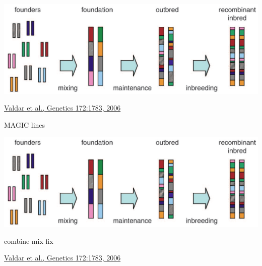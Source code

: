 \documentclass[12pt]{article}
\newcommand{\citesize}{\fontsize{14}{18} \selectfont}
\newcommand{\headsize}{\fontsize{35}{35} \selectfont}
\newcommand{\smallsize}{\fontsize{25}{30} \selectfont}
\begin{document}
\vspace{20mm}

\centerline{\includegraphics[width=10in]{Figs/valdar_genet2006.png}}

\vfill

\hfill {\citesize \color{citecolor} \href{http://www.genetics.org/content/172/3/1783.full}{Valdar et al., Genetics 172:1783, 2006}}

\vspace*{5mm}


\newpage

\addtocounter{page}{-1}

\headsize \color{myyellow}
\hfill \begin{minipage}{5.75in}
\centering
MAGIC lines
\end{minipage}

\vspace{20mm}

\centerline{\includegraphics[width=10in]{Figs/valdar_genet2006.png}}

\smallsize \color{myyellow}
\hspace*{52mm} combine \hspace*{35mm} mix \hspace*{52mm} fix

\vfill

\hfill {\citesize \color{citecolor} \href{http://www.genetics.org/content/172/3/1783.full}{Valdar et al., Genetics 172:1783, 2006}}

\vspace*{5mm}


\newpage
\end{document}
